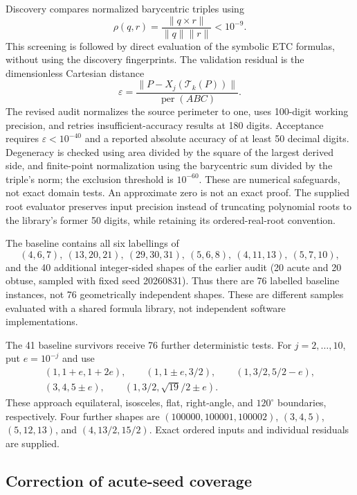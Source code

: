 \documentclass[11pt]{article}
\begin{document}
Discovery compares normalized barycentric triples using
\begin{equation}\label{eq:projective-residual}
 \rho(q,r)=\frac{\|q\times r\|}{\|q\|\|r\|}<10^{-9}.
\end{equation}
This screening is followed by direct evaluation of the symbolic ETC
formulas, without using the discovery fingerprints.  The validation
residual is the dimensionless Cartesian distance
\begin{equation}\label{eq:cartesian-residual}
 \varepsilon=\frac{\|P-X_j(\mathcal T_k(P))\|}{\operatorname{per}(ABC)}.
\end{equation}
The revised audit normalizes the source perimeter to one, uses 100-digit
working precision, and retries insufficient-accuracy results at 180 digits.
Acceptance requires $\varepsilon<10^{-40}$ and a reported absolute
accuracy of at least 50 decimal digits.  Degeneracy is checked using
area divided by the square of the largest derived side, and finite-point
normalization using the barycentric sum divided by the triple's norm;
the exclusion threshold is $10^{-60}$.  These are numerical safeguards,
not exact domain tests.  An approximate zero is not an exact proof.
The supplied root evaluator preserves input precision instead of
truncating polynomial roots to the library's former 50 digits,
while retaining its ordered-real-root convention.

The baseline contains all six labellings of
\[
 (4,6,7),\ (13,20,21),\ (29,30,31),\
 (5,6,8),\ (4,11,13),\ (5,7,10),
\]
and the 40 additional integer-sided shapes of the earlier audit
(20 acute and 20 obtuse, sampled with fixed seed 20260831).
Thus there are 76 labelled baseline instances, not 76 geometrically
independent shapes.  These are different samples evaluated with a shared
formula library, not independent software implementations.

The 41 baseline survivors receive 76 further deterministic tests.
For $j=2,\ldots,10$, put $e=10^{-j}$ and use
\[
\begin{gathered}
 (1,1+e,1+2e),\qquad (1,1\pm e,3/2),\qquad
 (1,3/2,5/2-e),\\
 (3,4,5\pm e),\qquad (1,3/2,\sqrt{19}/2\pm e).
\end{gathered}
\]
These approach equilateral, isosceles, flat, right-angle, and
$120^\circ$ boundaries, respectively.  Four further shapes are
$(100000,100001,100002)$, $(3,4,5)$, $(5,12,13)$, and
$(4,13/2,15/2)$.  Exact ordered inputs and individual residuals are supplied.

\subsection{Correction of acute-seed coverage}
\end{document}
